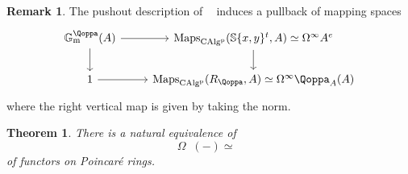 \documentclass{article}
\DeclareMathOperator{\CAlgp}{CAlg^p} %
\DeclareMathOperator{\Picp}{Pic^p} %
\DeclareMathOperator{\gmq}{\mathbb{G}_m^\Qoppa}
\newtheorem{theorem}[equation]{Theorem}
\theoremstyle{definition}
\newtheorem{remark}[equation]{Remark}
\begin{document}
\begin{remark}\label{remark:Poincare_units_fiber_sequence}
    The pushout description of $\gmq$ induces a pullback of mapping spaces
    \[
    \begin{tikzcd}
        \gmq(A) \ar[d] \ar[r] & \mathrm{Maps}_{\CAlgp}(\mathbb{S}\{x, y\}^t, A)\simeq \Omega^\infty A^e\ar[d]\\
        1 \ar[r] & \mathrm{Maps}_{\CAlgp}(R_\Qoppa,A)\simeq \Omega^\infty\Qoppa_A(A) 
    \end{tikzcd}
    \] where the right vertical map is given by taking the norm.
\end{remark}
\begin{theorem}\label{theorem:loops_Poincare_pic_is_Gm_Qoppa}
	There is a natural equivalence of \[\Omega \Picp(-)\simeq \gmq\] of functors on Poincar{\'e} rings.
\end{theorem}
\end{document}
